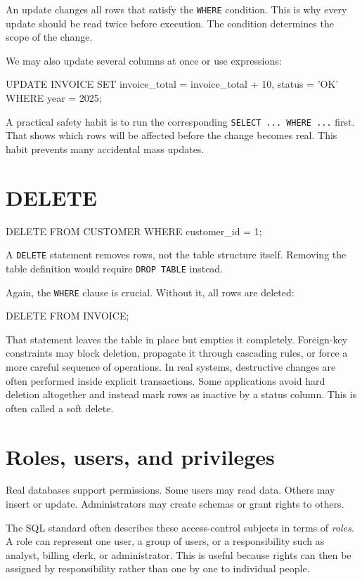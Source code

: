 \documentclass[11pt,a4paper,openany]{book}
\begin{document}
An update changes all rows that satisfy the \texttt{WHERE} condition. This is why every update should be read twice before execution. The condition determines the scope of the change.

We may also update several columns at once or use expressions:
\begin{codesql}
UPDATE INVOICE
SET invoice_total = invoice_total + 10,
    status = 'OK'
WHERE year = 2025;
\end{codesql}

A practical safety habit is to run the corresponding \texttt{SELECT ... WHERE ...} first. That shows which rows will be affected before the change becomes real. This habit prevents many accidental mass updates.

\section{DELETE}
\begin{codesql}
DELETE FROM CUSTOMER
WHERE customer_id = 1;
\end{codesql}

A \texttt{DELETE} statement removes rows, not the table structure itself. Removing the table definition would require \texttt{DROP TABLE} instead.

Again, the \texttt{WHERE} clause is crucial. Without it, all rows are deleted:
\begin{codesql}
DELETE FROM INVOICE;
\end{codesql}

That statement leaves the table in place but empties it completely. Foreign-key constraints may block deletion, propagate it through cascading rules, or force a more careful sequence of operations. In real systems, destructive changes are often performed inside explicit transactions. Some applications avoid hard deletion altogether and instead mark rows as inactive by a status column. This is often called a soft delete.

\section{Roles, users, and privileges}
Real databases support permissions. Some users may read data. Others may insert or update. Administrators may create schemas or grant rights to others.

The SQL standard often describes these access-control subjects in terms of \emph{roles}. A role can represent one user, a group of users, or a responsibility such as analyst, billing clerk, or administrator. This is useful because rights can then be assigned by responsibility rather than one by one to individual people.
\end{document}
